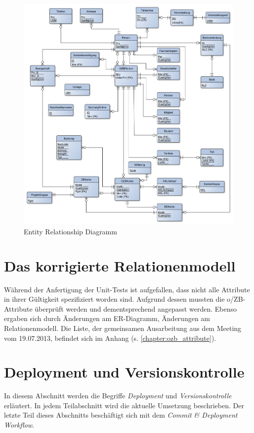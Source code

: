 \documentclass[12pt,             %
               a4paper,          %
               listof=totoc,     %
               index=totoc,      %
               bibliography=totoc,%
               oneside,         %
               BCOR1cm,          %
               english   %
               ]{scrbook}
\begin{document}
\begin{figure}[H]
     \begin{center}
          \includegraphics[width=\textwidth]{Media/er_diagramm.pdf}
     \end{center}
     \caption{Entity Relationship Diagramm}
     \label{fig:er_diagramm}
\end{figure} 


\section{Das korrigierte Relationenmodell}
Während der Anfertigung der Unit-Tests ist aufgefallen, dass nicht alle Attribute in ihrer Gültigkeit spezifiziert worden sind. Aufgrund dessen mussten die o/ZB-Attribute überprüft werden und dementsprechend angepasst werden. Ebenso ergaben sich durch Änderungen am ER-Diagramm, Änderungen am Relationenmodell. Die Liste, der gemeinsamen Ausarbeitung aus dem Meeting vom 19.07.2013, befindet sich im Anhang (s. \vref{chapter:ozb_attribute}).

\section{Deployment und Versionskontrolle}
In diesem Abschnitt werden die Begriffe \textit{Deployment} und \textit{Versionskontrolle} erläutert. In jedem Teilabschnitt wird die aktuelle Umsetzung beschrieben. Der letzte Teil dieses Abschnitts beschäftigt sich mit dem \textit{Commit \& Deployment Workflow}.
\end{document}
